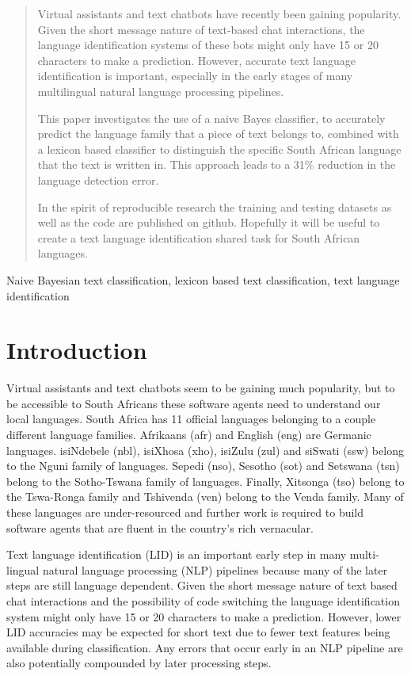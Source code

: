 \documentclass[conference]{IEEEtran}
\begin{document}
\begin{abstract}
Virtual assistants and text chatbots have recently been gaining popularity. Given the short message nature of text-based chat interactions, the language identification systems of these bots might only have 15 or 20 characters to make a prediction. However, accurate text language identification is important, especially in the early stages of many multilingual natural language processing pipelines.

This paper investigates the use of a naive Bayes classifier, to accurately predict the language family that a piece of text belongs to, combined with a lexicon based classifier to distinguish the specific South African language that the text is written in. This approach leads to a 31\% reduction in the language detection error.

In the spirit of reproducible research the training and testing datasets as well as the code are published on github. Hopefully it will be useful to create a text language identification shared task for South African languages.
\end{abstract}

\begin{IEEEkeywords}
Naive Bayesian text classification, lexicon based text classification, text language identification
\end{IEEEkeywords}

\section{Introduction}
\label{sec:intro}
Virtual assistants and text chatbots seem to be gaining much popularity, but to be accessible to South Africans these software agents need to understand our local languages. South Africa has 11 official languages belonging to a couple different language families. Afrikaans (afr) and English (eng) are Germanic languages. isiNdebele (nbl),  isiXhosa (xho), isiZulu (zul) and siSwati (ssw) belong to the Nguni family of languages. Sepedi (nso), Sesotho (sot) and Setswana (tsn) belong to the Sotho-Tswana family of languages. Finally, Xitsonga (tso) belong to the Tswa-Ronga family and Tshivenda (ven) belong to the Venda family. Many of these languages are under-resourced and further work is required to build software agents that are fluent in the country's rich vernacular.

Text language identification (LID) is an important early step in many multi-lingual natural language processing (NLP) pipelines because many of the later steps are still language dependent. Given the short message nature of text based chat interactions and the possibility of code switching the language identification system might only have 15 or 20 characters to make a prediction. However, lower LID accuracies may be expected for short text due to fewer text features being available during classification. Any errors that occur early in an NLP pipeline are also potentially compounded by later processing steps.
\end{document}
